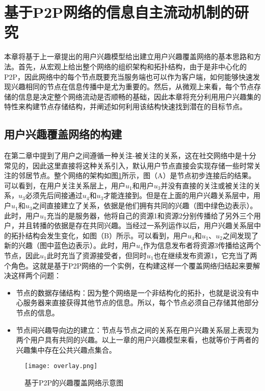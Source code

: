 \section{基于P2P网络的信息自主流动机制的研究}
本章将基于上一章提出的用户兴趣模型给出建立用户兴趣覆盖网络的基本思路和方法。首先，从宏观上给出整个网络的组织架构和拓扑结构，由于是非中心化的P2P，因此网络中的每个节点既要充当服务端也可以作为客户端，如何能够快速发现兴趣相同的节点在信息传播中是尤为重要的。然后，从微观上来看，每个节点存储的信息是决定整个网络流动是否顺畅的基础，因此本章将充分利用用户兴趣集的特性来构建节点存储结构，并阐述如何利用该结构快速找到潜在的目标节点。

\subsection{用户兴趣覆盖网络的构建}
在第二章中提到了用户之间遵循一种关注-被关注的关系，这在社交网络中是十分常见的，因此这里直接将这种关系引入，默认用户节点直接会实现存储一些时常关注的邻居节点。整个网络的架构如图\ref{fig:overlay}所示，图（A）是节点初步连接后的结果。可以看到，在用户关注关系层上，用户$u_1$和用户$u_3$并没有直接的关注或被关注的关系，$u_3$必须先后间接通过$u_4$和$u_3$才能连接到。但是在上面的用户兴趣关系层中，用户$u_1$和$u_3$之间直接建立了关系，依据是他们拥有共同的兴趣（图中绿色边表示）。此时，用户$u_1$充当的是服务器，他将自己的资源1和资源2分别传播给了另外三个用户，并且转播的依据是存在共同兴趣。当经过一系列运作以后，用户兴趣关系层中的拓扑结构会发生变化，如图（B）所示。可以看到，用户$u_4$和$u_1$、$u_2$之间发现了新的兴趣（图中蓝色边表示）。此时，用户$u_4$作为信息发布者将资源3传播给这两个节点，因此$u_1$此时充当了资源接受者，但同时$u_1$也在继续发布资源1，它充当了两个角色。这就是基于P2P网络的一个实例，在构建这样一个覆盖网络归结起来要解决这样两个问题：
\begin{itemize}
  \item 节点的数据存储结构：因为整个网络是一个非结构化的拓扑，也就是说没有中心服务器来直接获得其他节点的信息。所以，每个节点必须自己存储其他部分节点的信息。
  \item 节点间兴趣导向边的建立：节点与节点之间的关系在用户兴趣关系层上表现为两个用户具有共同的兴趣。以上一章的用户兴趣模型来看，也就等价于两者的兴趣集中存在公共兴趣点集合。
\end{itemize}

\begin{figure}[ht]
\centering
\texttt{[image: overlay.png]}
\caption{基于P2P的兴趣覆盖网络示意图}
\label{fig:overlay}
\end{figure}

